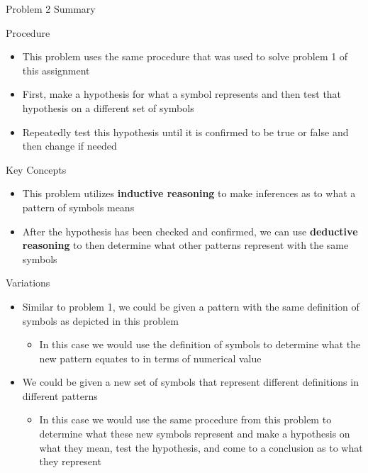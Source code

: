 \begin{summary}{Problem 2 Summary}
    \begin{statement}{Procedure}
        \begin{itemize}
            \item This problem uses the same procedure that was used to solve problem 1 of this assignment
            \item First, make a hypothesis for what a symbol represents and then test that hypothesis on a different set of symbols
            \item Repeatedly test this hypothesis until it is confirmed to be true or false and then change if needed
        \end{itemize}
    \end{statement}
    \begin{statement}{Key Concepts}
        \begin{itemize}
            \item This problem utilizes \textbf{inductive reasoning} to make inferences as to what a pattern of symbols means
            \item After the hypothesis has been checked and confirmed, we can use \textbf{deductive reasoning} to then determine what other patterns represent with the same symbols
        \end{itemize}
    \end{statement}
    \begin{statement}{Variations}
        \begin{itemize}
            \item Similar to problem 1, we could be given a pattern with the same definition of symbols as depicted in this problem
            \begin{itemize}
                \item In this case we would use the definition of symbols to determine what the new pattern equates to in terms of numerical value
            \end{itemize}
            \item We could be given a new set of symbols that represent different definitions in different patterns
            \begin{itemize}
                \item In this case we would use the same procedure from this problem to determine what these new symbols represent and make a hypothesis on what they mean, test the hypothesis, and 
                come to a conclusion as to what they represent
            \end{itemize}
        \end{itemize}
    \end{statement}
\end{summary}

